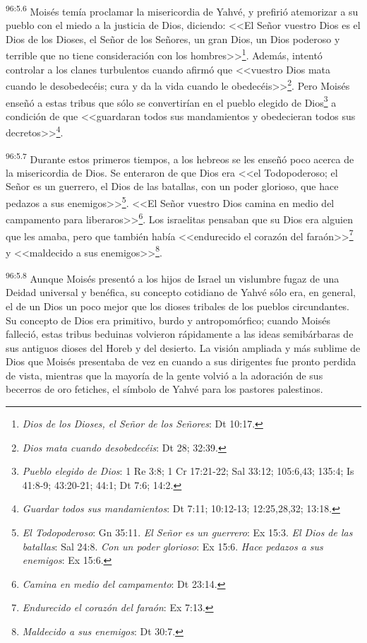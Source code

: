\par
\textsuperscript{96:5.6} Moisés temía proclamar la misericordia de Yahvé, y prefirió atemorizar a su pueblo con el miedo a la justicia de Dios, diciendo: <<El Señor vuestro Dios es el Dios de los Dioses, el Señor de los Señores, un gran Dios, un Dios poderoso y terrible que no tiene consideración con los hombres>>\footnote{\textit{Dios de los Dioses, el Señor de los Señores}: Dt 10:17.}. Además, intentó controlar a los clanes turbulentos cuando afirmó que <<vuestro Dios mata cuando le desobedecéis; cura y da la vida cuando le obedecéis>>\footnote{\textit{Dios mata cuando desobedecéis}: Dt 28; 32:39.}. Pero Moisés enseñó a estas tribus que sólo se convertirían en el pueblo elegido de Dios\footnote{\textit{Pueblo elegido de Dios}: 1 Re 3:8; 1 Cr 17:21-22; Sal 33:12; 105:6,43; 135:4; Is 41:8-9; 43:20-21; 44:1; Dt 7:6; 14:2.} a condición de que <<guardaran todos sus mandamientos y obedecieran todos sus decretos>>\footnote{\textit{Guardar todos sus mandamientos}: Dt 7:11; 10:12-13; 12:25,28,32; 13:18.}.

\par
\textsuperscript{96:5.7} Durante estos primeros tiempos, a los hebreos se les enseñó poco acerca de la misericordia de Dios. Se enteraron de que Dios era <<el Todopoderoso; el Señor es un guerrero, el Dios de las batallas, con un poder glorioso, que hace pedazos a sus enemigos>>\footnote{\textit{El Todopoderoso}: Gn 35:11. \textit{El Señor es un guerrero}: Ex 15:3. \textit{El Dios de las batallas}: Sal 24:8. \textit{Con un poder glorioso}: Ex 15:6. \textit{Hace pedazos a sus enemigos}: Ex 15:6.}. <<El Señor vuestro Dios camina en medio del campamento para liberaros>>\footnote{\textit{Camina en medio del campamento}: Dt 23:14.}. Los israelitas pensaban que su Dios era alguien que les amaba, pero que también había <<endurecido el corazón del faraón>>\footnote{\textit{Endurecido el corazón del faraón}: Ex 7:13.} y <<maldecido a sus enemigos>>\footnote{\textit{Maldecido a sus enemigos}: Dt 30:7.}.

\par
\textsuperscript{96:5.8} Aunque Moisés presentó a los hijos de Israel un vislumbre fugaz de una Deidad universal y benéfica, su concepto cotidiano de Yahvé sólo era, en general, el de un Dios un poco mejor que los dioses tribales de los pueblos circundantes. Su concepto de Dios era primitivo, burdo y antropomórfico; cuando Moisés falleció, estas tribus beduinas volvieron rápidamente a las ideas semibárbaras de sus antiguos dioses del Horeb y del desierto. La visión ampliada y más sublime de Dios que Moisés presentaba de vez en cuando a sus dirigentes fue pronto perdida de vista, mientras que la mayoría de la gente volvió a la adoración de sus becerros de oro fetiches, el símbolo de Yahvé para los pastores palestinos.

